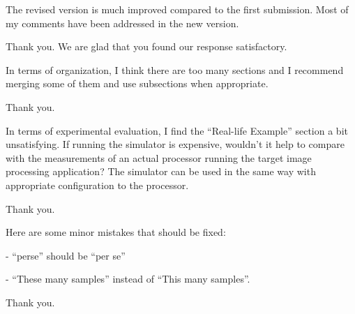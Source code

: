 \begin{reviewer}
The revised version is much improved compared to the first submission. Most of
my comments have been addressed in the new version.
\end{reviewer}

\begin{authors}
Thank you. We are glad that you found our response satisfactory.
\end{authors}

\begin{reviewer}
In terms of organization, I think there are too many sections and I recommend
merging some of them and use subsections when appropriate.
\end{reviewer}

\begin{authors}
Thank you.
\end{authors}

\begin{reviewer}
In terms of experimental evaluation, I find the ``Real-life Example'' section a
bit unsatisfying. If running the simulator is expensive, wouldn't it help to
compare with the measurements of an actual processor running the target image
processing application? The simulator can be used in the same way with
appropriate configuration to the processor.
\end{reviewer}

\begin{authors}
Thank you.
\end{authors}

\begin{reviewer}
Here are some minor mistakes that should be fixed:

\noindent- ``perse'' should be ``per se''

\noindent- ``These many samples'' instead of ``This many samples''.
\end{reviewer}

\begin{authors}
Thank you.
\end{authors}
